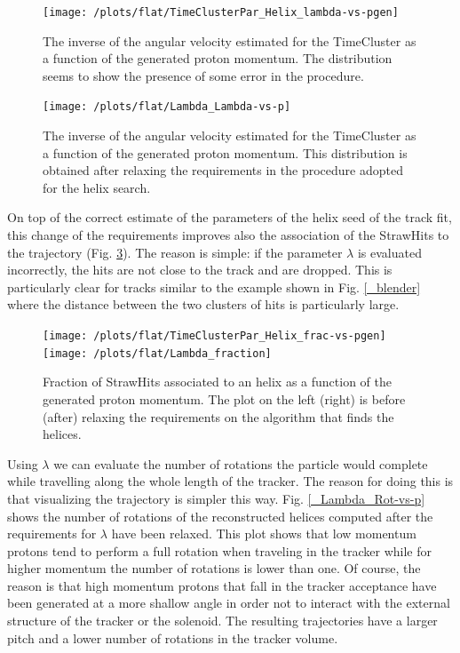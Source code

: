 \documentclass[12pt,a4paper,openright, oneside, titlepage]{book} %
\begin{document}
\begin{figure}[!htb]
\centering
\texttt{[image: /plots/flat/TimeClusterPar\_Helix\_lambda-vs-pgen]}
\caption[Inverse of angular velocity]{The inverse of the angular velocity estimated for the TimeCluster as a function of the generated proton momentum. 
The distribution seems to show the presence of some error in the procedure.}
\label{_TimeClusterMVA_Lambda-vs-p}
\end{figure}

\begin{figure}[!htb]
\centering
\texttt{[image: /plots/flat/Lambda\_Lambda-vs-p]}
\caption[Inverse of angular velocity after the change]{The inverse of the angular velocity estimated for the TimeCluster as a function of the generated proton momentum.
This distribution is obtained after relaxing the requirements in the procedure adopted for the helix search.}
\label{_Lambda_Lambda-vs-p}
\end{figure}

\noindent On top of the correct estimate of the parameters of the helix seed of the track fit, 
this change of the requirements improves also the association of the StrawHits to the trajectory 
(Fig. \ref{_active_SH_fraction}). 
The reason is simple: 
if the parameter $\lambda$ is evaluated incorrectly, 
the hits are not close to the track and are dropped. 
This is particularly clear for tracks similar to the example shown in Fig. \ref{_blender} 
where the distance between the two clusters of hits is particularly large. 

\begin{figure}[!htb]
\centering
\texttt{[image: /plots/flat/TimeClusterPar\_Helix\_frac-vs-pgen]}\hfill
\texttt{[image: /plots/flat/Lambda\_fraction]}
\caption[Fraction of StrawHits in a helix as a function of generated momentum]{Fraction of StrawHits associated to an helix as a function of the generated proton momentum. 
The plot on the left (right) is before (after) relaxing 
the requirements on the algorithm that finds the helices.}
\label{_active_SH_fraction}
\end{figure}

\noindent Using $\lambda$ we can evaluate the number of rotations the particle 
would complete while travelling along the whole length of the tracker. 
The reason for doing this is that visualizing the trajectory is simpler this way. 
Fig. \ref{_Lambda_Rot-vs-p} shows
the number of rotations of the reconstructed helices computed 
after the requirements for $\lambda$ have been relaxed.
This plot shows that low momentum protons tend to perform a full rotation when traveling in the tracker 
while for higher momentum the number of rotations is lower than one. 
Of course, the reason is that high momentum protons that fall in the tracker acceptance have been generated 
at a more shallow angle in order not to interact 
with the external structure of the tracker or the solenoid. 
The resulting trajectories have a larger pitch and a lower number of rotations in the tracker volume.\\
\end{document}

